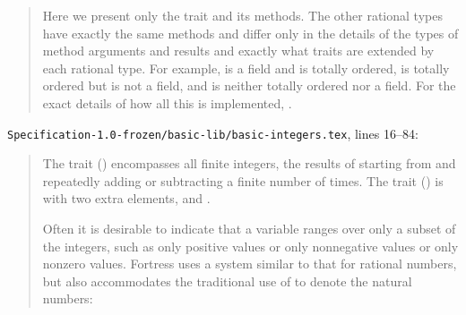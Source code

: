 \begin{description}
\begin{quote}
Here we present only the trait  and its methods.
The other rational types have exactly the same methods and differ
only in the details of the types of method arguments and results
and exactly what traits are extended by each rational type.
For example,  is a field and is totally ordered,
 is totally ordered but is not a field,
and  is neither totally ordered nor a field.
For the exact details of how all this is implemented, .
\end{quote}
\nolinkurl{Specification-1.0-frozen/basic-lib/basic-integers.tex}, lines 16--84:
\begin{quote}
The trait  () encompasses all finite integers,
the results of starting from  and repeatedly adding or subtracting  a finite number of times.
The trait  () is  with
two extra elements, \EXP{+\infty} and \EXP{-\infty}.

Often it is desirable to indicate that a variable ranges over only a subset of
the integers, such as only positive values or only nonnegative values or only
nonzero values.
Fortress uses a system similar to that for rational numbers, but also
accommodates the traditional use of  to denote the natural numbers:


\end{quote}
\end{description}
